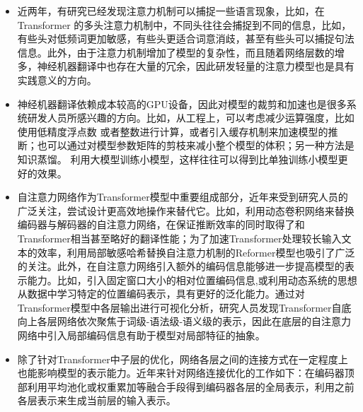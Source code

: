 \begin{itemize}
\vspace{0.5em}
\item 近两年，有研究已经发现注意力机制可以捕捉一些语言现象，比如，在Transformer 的多头注意力机制中，不同头往往会捕捉到不同的信息，比如，有些头对低频词更加敏感，有些头更适合词意消歧，甚至有些头可以捕捉句法信息。此外，由于注意力机制增加了模型的复杂性，而且随着网络层数的增多，神经机器翻译中也存在大量的冗余，因此研发轻量的注意力模型也是具有实践意义的方向。

\vspace{0.5em}
\item 神经机器翻译依赖成本较高的GPU设备，因此对模型的裁剪和加速也是很多系统研发人员所感兴趣的方向。比如，从工程上，可以考虑减少运算强度，比如使用低精度浮点数 或者整数进行计算，或者引入缓存机制来加速模型的推断；也可以通过对模型参数矩阵的剪枝来减小整个模型的体积；另一种方法是知识蒸馏。 利用大模型训练小模型，这样往往可以得到比单独训练小模型更好的效果。
\vspace{0.5em}
\item 自注意力网络作为Transformer模型中重要组成部分，近年来受到研究人员的广泛关注，尝试设计更高效地操作来替代它。比如，利用动态卷积网络来替换编码器与解码器的自注意力网络，在保证推断效率的同时取得了和Transformer相当甚至略好的翻译性能；为了加速Transformer处理较长输入文本的效率，利用局部敏感哈希替换自注意力机制的Reformer模型也吸引了广泛的关注。此外，在自注意力网络引入额外的编码信息能够进一步提高模型的表示能力。比如，引入固定窗口大小的相对位置编码信息,或利用动态系统的思想从数据中学习特定的位置编码表示，具有更好的泛化能力。通过对Transformer模型中各层输出进行可视化分析，研究人员发现Transformer自底向上各层网络依次聚焦于词级-语法级-语义级的表示，因此在底层的自注意力网络中引入局部编码信息有助于模型对局部特征的抽象。
\vspace{0.5em}
\item 除了针对Transformer中子层的优化，网络各层之间的连接方式在一定程度上也能影响模型的表示能力。近年来针对网络连接优化的工作如下：在编码器顶部利用平均池化或权重累加等融合手段得到编码器各层的全局表示，利用之前各层表示来生成当前层的输入表示。
\end{itemize}
